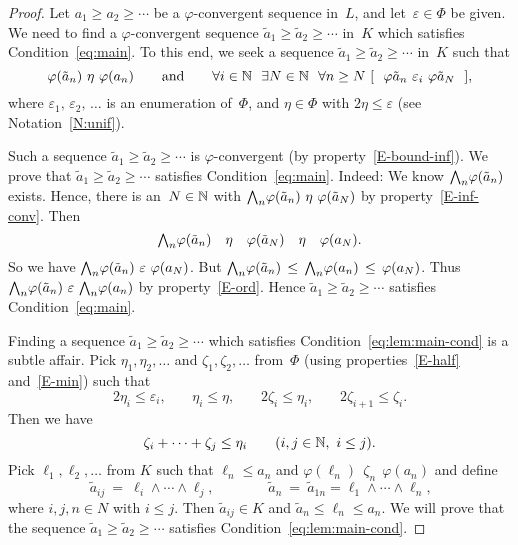 \documentclass[main.tex]{subfiles}
\begin{document}
\begin{proof}
Let $a_1 \geq a_2 \geq \dotsb$ 
be a $\varphi$-convergent sequence in~$L$,
and let~$\varepsilon\in\Phi$ be given.
We need to find a $\varphi$-convergent sequence 
$\tilde a_1 \geq \tilde a_2 \geq \dotsb$ in~$K$
which satisfies Condition~\eqref{eq:main}.
To this end,
we seek a sequence 
$\tilde a_1 \geq \tilde a_2 \geq \dotsb$ in~$K$
such that
\begin{equation}
\label{eq:lem:main-cond}
\varphi(\tilde a_n) \ \eta\ \varphi (a_n)
\qquad\text{and}\qquad
\forall i\in\N\ \ \exists N\in\N 
\ \ \forall n\geq N
\  [\ \  \varphi \tilde a_n \ \varepsilon_i\  \varphi \tilde a_N \ \ ],
\end{equation}
where $\varepsilon_1,\,\varepsilon_2,\,\dotsc$
is
an enumeration of~$\Phi$,
and $\eta\in\Phi$ with  $2\eta \leq \varepsilon$
(see Notation~\ref{N:unif}).

Such a sequence $\tilde a_1 \geq \tilde a_2 \geq \dotsb$
is $\varphi$-convergent 
(by property~\ref{E-bound-inf}).
We prove that $\tilde a_1 \geq \tilde a_2 \geq\dotsb$
satisfies Condition~\eqref{eq:main}. 
Indeed:
We know $\textstyle{\bigwedge}_n \varphi(\tilde a_n)$ exists.
Hence,
there is an~$N\in\mathbb{N}$
with 
 $\textstyle{\bigwedge}_n\varphi (\tilde a_n)\ \eta\ \varphi (\tilde a_N)$
by property~\ref{E-inf-conv}.
Then
\begin{equation*}
\textstyle{\bigwedge}_n \varphi (\tilde a_n) \quad \eta \quad \varphi(\tilde a_N)
\quad\eta\quad \varphi(a_N).
\end{equation*}
So we have 
$\bw_n \varphi (\tilde a_n) \ \ve\  \varphi(a_N)$.
But $\textstyle{\bigwedge}_n \varphi(\tilde a_n) \,\leq\,
\textstyle{\bigwedge}_n \varphi(a_n) \,\leq\,\varphi(a_N)$.
Thus 
$\bw_n \varphi(\tilde a_n) \ \ve\ 
\bw_n \varphi(a_n)$ by property~\ref{E-ord}.
Hence $\tilde a_1  \geq \tilde a_2 \geq \dotsb$
satisfies Condition~\eqref{eq:main}.

Finding a sequence $\tilde a_1 \geq \tilde a_2 \geq \dotsb$ 
which satisfies Condition~\eqref{eq:lem:main-cond}
is a subtle affair.
Pick $\eta_1, \eta_2,\dotsc$ and $\zeta_1,\zeta_2,\dotsc$
from~$\Phi$
(using properties~\ref{E-half}
and~\ref{E-min})
such that
\begin{equation*}
2 \eta_i \leq \varepsilon_i\text{,} \qquad
\eta_i \leq \eta\text{,} \qquad
2\zeta_i \leq \eta_i\text{,} \qquad
2\zeta_{i+1} \leq \zeta_{i}\text{.}
\end{equation*}
Then we have
\begin{equation}
\label{eq:lem:main-zeta--eta}
\zeta_i + \dotsb + \zeta_j \leq \eta_i \qquad (i,j\in\mathbb{N},\  i\leq j)\text{.}
\end{equation}
Pick $\ell_1,\ell_2,\dotsc$ from $K$ 
such that $\ell_n \leq a_n$ and $\varphi(\ell_n)\ \ \zeta_n\  \ \varphi(a_n)$
and define 
\begin{equation*}
\tilde{a}_{ij} \ =\ \ell_i \wedge \dotsb\wedge \ell_j\text{,}
\qquad\qquad
\tilde{a}_n \ =\ \tilde{a}_{1n} =\ell_1 \wedge\dotsb\wedge \ell_n\text{,}
\end{equation*}
where $i,j,n\in N$ with $i\leq j$.
Then $\tilde a_{ij} \in K$ and  $\tilde a_n \leq \ell_n \leq a_n$.
We will prove that
the sequence $\tilde a_1 \geq \tilde a_2 \geq \dotsb$
satisfies Condition~\eqref{eq:lem:main-cond}.


\end{proof}
\end{document}
